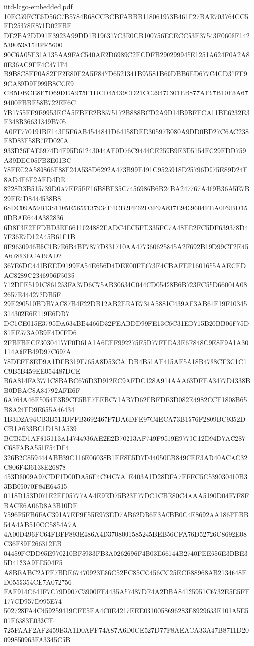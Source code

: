 \begin{filecontents*}[overwrite]{iitd-logo-embedded.pdf}
10FC59FCE5D56C7B5784B68CCBCBFABBB118061973B461F27BAE703764CC5FD25378E871D02FBF
DE2BA2DD91F3923A99DD1B196317C3E0CB100756ECECC53E37543F0608F142539053815BFE5600
90C6A05F31A135AA9FAC540AE2D6989C2ECDFB290299945E1251A624F0A2A80E36AC9FF4C471F4
B9B8C8FF0A82FF2E80F2A5F847D6521341B97581B60DBB6ED677C4CD37FF99CA89D9F999B8CCE9
CB5DBCE8F7D69DEA975F1DCD45439CD21CC29470301EB877AF97B10E3A679400FBBE58B722EF6C
7B1755FF9E9953ECA5FBFE2B8575172B888BCD2A9D14B9BFFCA11BE6232E3E348B36631349B705
A0FF770191BF143F5F6AB4544841D64158DED30597B080A9DD0BD27C6AC238E8D83F58B7FD020A
933D26FAE5974D4F95D61243044AF0D76C9444CE259B9E3D5154FC29FDD759A39DEC05FB3E01BC
78FEC2A580866F88F24A538D6292A473B99E191C9525918D25796D975E89D24F8AD4F6F2AED4DE
8228D3B515739D0A7EF5FF16B8BF35C7456986B6B24BA247767A469B36A5E7B29FE4D8444538B8
68DC09A59B1381105E5655137934F4CB2FF62D3F9A837E9439604EEA0F9BD150DBAE644A382836
6D8F3E2FFDBD3EF6611024882EADC4EC5FD335FC7A48EE2FC5DF639378D47F36E7D12A45B61F1B
0F9630946B5C1B7E6B4BF7877D831710AA477360625845A2F692B19D99CF2E45A67883ECA19AD2
367E6DC441BEED9199FA54E656D4DEE00FE673F4CBAFEF1601655AAECEDAC8289C2346996F5035
712DFE5191C861253FA37D6C75AB30634C044CD05428B6B723FC55D66004A082657E444273DB5F
29E290510BDB7AC87B4F22DB12AB2EEAE734A5881C439AF3AB61F19F10345314302E6E119E6DD7
DC1CE015E3795DA634BB4466D32FEABDD99FE13C6C31ED715B20BB06F75D81EF573A0B9F4D0FD6
2FBFBECF30304177F0D61A1A6EFF992275F5D77FFEA3E6F848C9E8F9A1A30114A6FB49D97C697A
78DEFE8ED9A1DFB319F765A8D53CA1DB4B51AF415AF5A18B4788CF3C1C1C9B5B459EE054487DCE
B6A814FA3771C8BABC676D3D912EC9AFDC128A914AAA63DFEA3477D4338BB0DBAC8A84792AFE6F
6A764A46F5054E3B9CE5BF7EEBC71AB7D62FBFDE3D082E4982CCF1808B65B8A24FD9E655A46434
1B3D2A94CB3B513DFFB3692467F7DA6DFE97C4ECA73B1576F2809BC9352DCB1A633BC1D181A539
BCB3D1AF615113A14744936AE2E2B70213AF749F9519E9770C12D94D7AC287C68FABA551F54DF4
326B2C859444ABB39C116E06038B1EF8E5D7D44050EB849CEF3AD40ACAC32C806F436138E26878
453D8009A97CDF1D00DA56F4C94C7A1E403A1D28DFA7FFFC5C539030410B33BB05070F84E64515
0118D153D071E2EF05777AA4E9ED75B23F77DC1CBE80C4AAA5190D04F7F8FBACE6A06D8A3B10DE
7596F5FB6FAC391A7EF9F55E973ED7AB62DB6F3A0BB0C4E8692AA186FEBB54A4AB510CC5854A7A
4A00D496FC64FBFF893E486A4D3708001585245BEB56CFA76D52726C8692E08C36F89F266312EB
04459FCDD95E970210BF5933FB3A0262696F4B03E66144B2740FEE656E3DBE35D4123A9EE504F5
A8BEABC2AFF7BDE67470923E86C52BC85CC456CC25ECE88968AB2134648ED0555354CE7A072756
FAF914C641F7C79D907C3900FE4435A57487DF4A2DBA84125951C6732E5E5FF177CD957D995E74
502728FA4C459259419CFE5EA4C0E4217EEE0310058696283E8929633E101A5E501E6383E033CE
725FAAF2AF2459E3A1D0AFF74A87A6D0CE527D77F8AEACA33A47B8711D20099850963FA3345C5B

\end{filecontents*}
